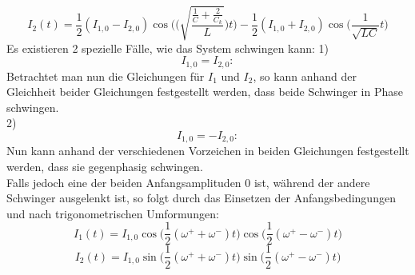 \begin{equation}
    I_2(t) = \frac{1}{2}(I_{1,0}-I_{2,0})\cos\Biggl(\Biggl(\sqrt{\frac{\frac{1}{C}+\frac{2}{C_k}}{L}}\Biggr)t\Biggr)-\frac{1}{2}(I_{1,0}+I_{2,0})\cos\Biggl(\frac{1}{\sqrt{LC}}t\Biggr)
\end{equation}
Es existieren 2 spezielle Fälle, wie das System schwingen kann:
1)
\begin{equation}
    I_{1,0}=I_{2,0}:
\end{equation}
Betrachtet man nun die Gleichungen für \(I_1\) und \(I_2\), so kann anhand der Gleichheit beider Gleichungen festgestellt werden, dass beide Schwinger in Phase schwingen.
\\
2)
\begin{equation}
    I_{1,0}=-I_{2,0}:
\end{equation}
Nun kann anhand der verschiedenen Vorzeichen in beiden Gleichungen festgestellt werden, dass sie gegenphasig schwingen.
\\
Falls jedoch eine der beiden Anfangsamplituden 0 ist, während der andere Schwinger ausgelenkt ist, so folgt durch das Einsetzen der Anfangsbedingungen und nach trigonometrischen Umformungen:
\begin{equation}
    I_1(t)=I_{1,0}\cos\Biggl(\frac{1}{2}(\omega^{+}+\omega^{-})t\Biggr)\cos\Biggl(\frac{1}{2}(\omega^{+}-\omega^{-})t\Biggr)
\end{equation}
\begin{equation}
    I_2(t)=I_{1,0}\sin\Biggl(\frac{1}{2}(\omega^{+}+\omega^{-})t\Biggr)\sin\Biggl(\frac{1}{2}(\omega^{+}-\omega^{-})t\Biggr)
\end{equation}
